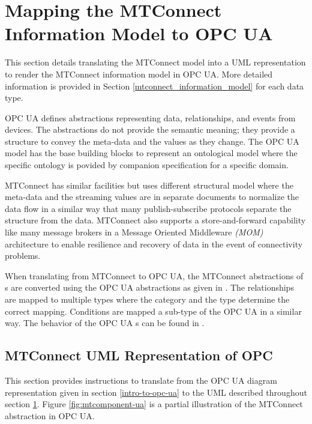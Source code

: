 \section{Mapping the MTConnect Information Model to OPC UA} 
  \label{mtconnect-mapping}

This section details translating the MTConnect model into a UML representation to render the MTConnect information model in OPC UA. More detailed information is provided in Section \ref{mtconnect_information_model} for each data type.

OPC UA defines abstractions representing data, relationships, and events from devices. The abstractions do not provide the semantic meaning; they provide a structure to convey the meta-data and the values as they change. The OPC UA model has the base building blocks to represent an ontological model where the specific ontology is povided by companion specification for a specific domain.

MTConnect has similar facilities but uses different structural model where the meta-data and the streaming values are in separate documents to normalize the data flow in a similar way that many publish-subscribe protocols separate the structure from the data. MTConnect also supports a store-and-forward capability like many message brokers in a Message Oriented Middleware \textit{(MOM)} architecture to enable resilience and recovery of data in the event of connectivity problems.

When translating from MTConnect to OPC UA, the MTConnect abstractions of s are converted using the OPC UA   abstractions as given in \cite{UAPart8}.  The relationships are mapped to multiple  types where the category and the type determine the correct mapping. Conditions are mapped a sub-type of the OPC UA  in a similar way. The behavior of the OPC UA s can be found in \cite{UAPart9}.

\subsection{MTConnect UML Representation of OPC}

This section provides instructions to translate from the OPC UA diagram representation given in section \ref{intro-to-opc-ua} to the UML described throughout section \ref{mtconnect-mapping}. Figure \ref{fig:mtcomponent-ua} is a partial illustration of the MTConnect  abstraction in OPC UA.

